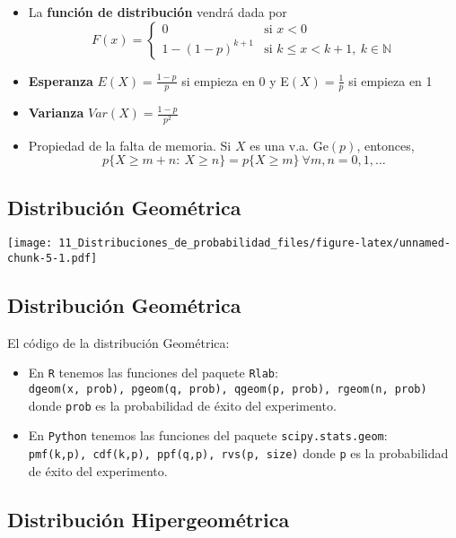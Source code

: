 \documentclass[
]{article}
\providecommand{\tightlist}{%
  \setlength{\itemsep}{0pt}\setlength{\parskip}{0pt}}
\begin{document}
\begin{itemize}
\tightlist
\item
  La \textbf{función de distribución} vendrá dada por \[F(x) = \left\{
  \begin{array}{cl}
     0 & \text{si } x<0 
  \\ 1-(1-p)^{k+1} & \text{si } k\le x<k+1,\ k\in\mathbb{N}
  \end{array}
  \right.\]
\item
  \textbf{Esperanza} \(E(X) = \frac{1-p}{p}\) si empieza en 0 y
  E\((X) = \frac{1}{p}\) si empieza en 1
\item
  \textbf{Varianza} \(Var(X) = \frac{1-p}{p^2}\)
\item
  Propiedad de la falta de memoria. Si \(X\) es una v.a.
  \(\text{Ge}(p)\), entonces,
  \[p\{X\ge m+n:\ X\ge n\} = p\{X\ge m\}\ \forall m,n=0,1,\dots\]
\end{itemize}

\hypertarget{distribuciuxf3n-geomuxe9trica-2}{%
\subsection{Distribución
Geométrica}\label{distribuciuxf3n-geomuxe9trica-2}}

\texttt{[image: 11\_Distribuciones\_de\_probabilidad\_files/figure-latex/unnamed-chunk-5-1.pdf]}

\hypertarget{distribuciuxf3n-geomuxe9trica-3}{%
\subsection{Distribución
Geométrica}\label{distribuciuxf3n-geomuxe9trica-3}}

El código de la distribución Geométrica:

\begin{itemize}
\tightlist
\item
  En \texttt{R} tenemos las funciones del paquete \texttt{Rlab}:
  \texttt{dgeom(x,\ prob),\ pgeom(q,\ prob),\ qgeom(p,\ prob),\ rgeom(n,\ prob)}
  donde \texttt{prob} es la probabilidad de éxito del experimento.
\item
  En \texttt{Python} tenemos las funciones del paquete
  \texttt{scipy.stats.geom}:
  \texttt{pmf(k,p),\ cdf(k,p),\ ppf(q,p),\ rvs(p,\ size)} donde
  \texttt{p} es la probabilidad de éxito del experimento.
\end{itemize}

\hypertarget{distribuciuxf3n-hipergeomuxe9trica}{%
\subsection{Distribución
Hipergeométrica}\label{distribuciuxf3n-hipergeomuxe9trica}}
\end{document}
